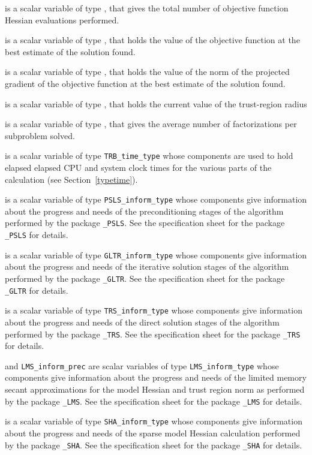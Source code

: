 \documentclass{galahad}
\newcommand{\packagename}{TRB}
\begin{document}
\begin{description}
 is a scalar variable of type \integer, that gives the
total number of objective function Hessian evaluations performed.

 is a scalar variable of type \realdp, that holds the
value of the objective function at the best estimate of the solution found.

 is a scalar variable of type \realdp, that holds the
value of the norm of the projected gradient of the objective function 
at the best estimate of the solution found.

 is a scalar variable of type \realdp, that holds
the current value of the trust-region radius

 is a scalar variable of type \realdp, that
gives the average number of factorizations per subproblem solved.

 is a scalar variable of type {\tt \packagename\_time\_type}
whose components are used to hold elapsed elapsed CPU and system clock
times for the various parts of the calculation (see Section~\ref{typetime}).

 is a scalar variable of type
{\tt PSLS\_inform\_type}
whose components give information about the progress and needs
of the preconditioning stages of the algorithm performed by the package
{\tt \libraryname\_PSLS}.
See the specification sheet for the package
{\tt \libraryname\_PSLS}
for details.

 is a scalar variable of type
{\tt GLTR\_inform\_type}
whose components give information about the progress and needs
of the iterative solution stages of the algorithm performed by the package
{\tt \libraryname\_GLTR}.
See the specification sheet for the package
{\tt \libraryname\_GLTR}
for details.

 is a scalar variable of type
{\tt TRS\_inform\_type}
whose components give information about the progress and needs
of the direct solution stages of the algorithm performed by the package
{\tt \libraryname\_TRS}.
See the specification sheet for the package
{\tt \libraryname\_TRS}
for details.

 and {\tt LMS\_inform\_prec} 
are scalar variables of type
{\tt LMS\_inform\_type}
whose components give information about the progress and needs
of the limited memory secant approximations for the model Hessian
and trust region norm as performed by the package
{\tt \libraryname\_LMS}.
See the specification sheet for the package
{\tt \libraryname\_LMS}
for details.

 is a scalar variable of type
{\tt SHA\_inform\_type}
whose components give information about the progress and needs
of the sparse model Hessian calculation performed by the package
{\tt \libraryname\_SHA}.
See the specification sheet for the package
{\tt \libraryname\_SHA}
for details.

\end{description}
\end{document}
